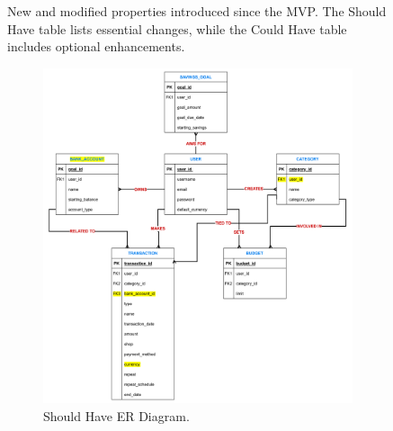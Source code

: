 \documentclass{l4proj}
\begin{document}
\begin{figure}[htb]
    \caption{New and modified properties introduced since the MVP. The Should Have table lists essential changes, while the Could Have table includes optional enhancements.}
    \label{fig:non-mvp-tables}
\end{figure}
\normalsize

\begin{figure}[htb] 
    \centering
    \begin{subfigure}[b]{0.45\textwidth}
        \includegraphics[width=\textwidth]{images/ER-Diagrams/final_should_have_ER.png}
        \caption{Should Have ER Diagram.}
        \label{fig:syn1}
    \end{subfigure}
    \begin{subfigure}[b]{0.45\textwidth}

\end{subfigure}
\end{figure}
\end{document}
